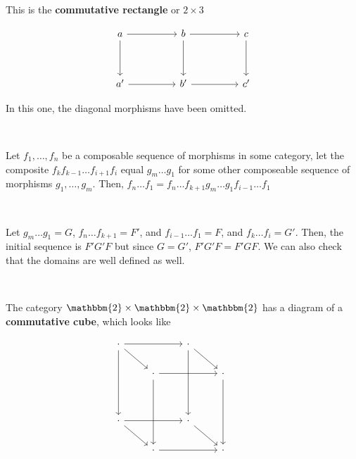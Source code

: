 \documentclass{article}
\begin{document}
\begin{example}
\

This is the \textbf{commutative rectangle} or $2 \times 3$ 

\[\begin{tikzcd}
	a &&b &&c \\
    \\
    a' &&b' &&c'
    \arrow[from=1-1, to=1-3]
    \arrow[from=1-3, to=1-5]
    \arrow[from=1-1, to=3-1]
    \arrow[from=3-1, to=3-3]
    \arrow[from=3-3, to=3-5]
    \arrow[from=1-3, to=3-3]
    \arrow[from=1-5, to=3-5]
\end{tikzcd}\]

In this one, the diagonal morphisms have been omitted.
\end{example}

\begin{lemma}
\

Let $f_1, \dots, f_n$ be a composable sequence of morphisms in some category, let the composite $f_k f_{k-1} \dots f_{i+1}f_i$ equal $g_m \dots g_1$ for some other composeable sequence of morphisms $g_1, \dots, g_m$. Then, $f_n \dots f_1 = f_n \dots f_{k+1} g_m \dots g_1 f_{i-1} \dots f_1$
\end{lemma}

\begin{customproof}
\

Let $g_m \dots g_1 = G$, $f_n \dots f_{k+1} = F'$, and $f_{i-1} \dots f_1 = F$, and $f_{k} \dots f_i = G'$. Then, the initial sequence is $F'G'F$ but since $G=G'$, $F'G'F = F'GF$. We can also check that the domains are well defined as well.
\end{customproof}

\begin{example}
\

The category $\mathbbm{2} \times \mathbbm{2} \times \mathbbm{2}$ has a diagram of a \textbf{commutative cube}, which looks like 

\[\begin{tikzcd}
	\cdot &&\cdot && \\
    & \cdot && \cdot \\ \\
    \cdot && \cdot &&\\
    & \cdot && \cdot
    \arrow[from=1-1, to=1-3]
    \arrow[from=1-1, to=2-2]
    \arrow[from=1-3, to=2-4]
    \arrow[from=2-2, to=2-4]
    \arrow[from=1-1, to=4-1]
    \arrow[from=1-3, to=4-3]
    \arrow[from=2-2, to=5-2]
    \arrow[from=2-4, to=5-4]
    \arrow[from=4-1, to=5-2]
    \arrow[from=4-1, to=4-3]
    \arrow[from=4-3, to=5-4]
    \arrow[from=5-2, to=5-4]
\end{tikzcd}\]
\end{example}
\end{document}
